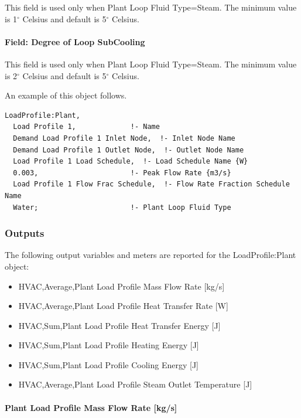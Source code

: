 This field is used only when Plant Loop Fluid Type=Steam. The minimum value is 1$^\circ$ Celsius and default is 5$^\circ$ Celsius.

\paragraph{Field: Degree of Loop SubCooling}\label{field-degree-of-loop-subcooling-load-profile}

This field is used only when Plant Loop Fluid Type=Steam. The minimum value is 2$^\circ$ Celsius and default is 5$^\circ$ Celsius.

An example of this object follows.

\begin{lstlisting}
LoadProfile:Plant,
  Load Profile 1,             !- Name
  Demand Load Profile 1 Inlet Node,  !- Inlet Node Name
  Demand Load Profile 1 Outlet Node,  !- Outlet Node Name
  Load Profile 1 Load Schedule,  !- Load Schedule Name {W}
  0.003,                      !- Peak Flow Rate {m3/s}
  Load Profile 1 Flow Frac Schedule,  !- Flow Rate Fraction Schedule Name
  Water;                      !- Plant Loop Fluid Type
\end{lstlisting}

\subsubsection{Outputs}\label{outputs-020}

The following output variables and meters are reported for the LoadProfile:Plant object:

\begin{itemize}
\item
  HVAC,Average,Plant Load Profile Mass Flow Rate {[}kg/s{]}
\item
  HVAC,Average,Plant Load Profile Heat Transfer Rate {[}W{]}
\item
  HVAC,Sum,Plant Load Profile Heat Transfer Energy {[}J{]}
\item
  HVAC,Sum,Plant Load Profile Heating Energy {[}J{]}
\item
  HVAC,Sum,Plant Load Profile Cooling Energy {[}J{]}
\item
  HVAC,Average,Plant Load Profile Steam Outlet Temperature {[}J{]}
\end{itemize}

\paragraph{Plant Load Profile Mass Flow Rate {[}kg/s{]}}\label{plant-load-profile-mass-flow-rate-kgs}

